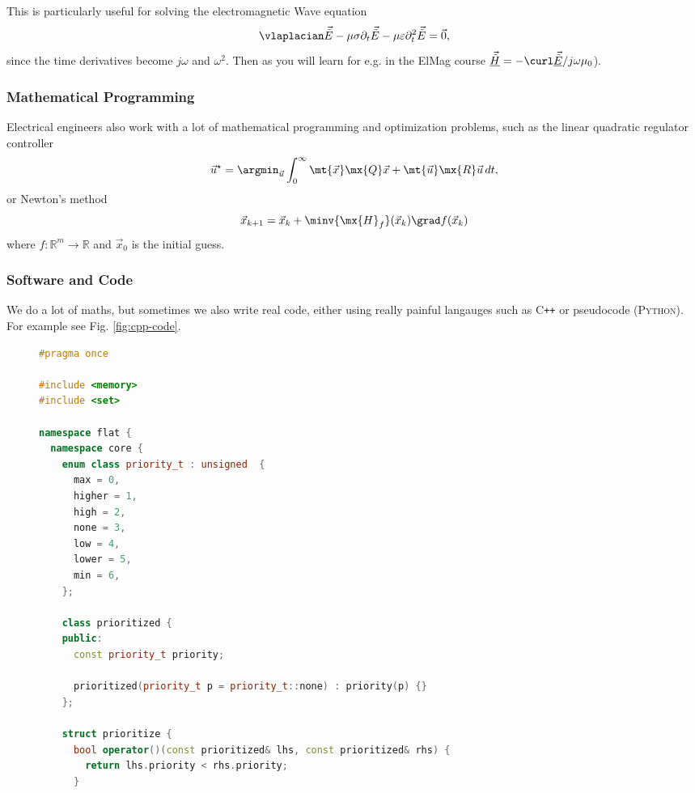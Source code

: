\documentclass[margin=normal]{hsrzf}
\begin{document}
\begin{english}
  This is particularly useful for solving the electromagnetic Wave equation
  \[
    \vlaplacian \vec{\tilde{E}} - \mu\sigma \partial_t \vec{\tilde{E}}
      - \mu\varepsilon \partial_t^2 \vec{\tilde{E}} = \vec{0},
  \]
  since the time derivatives become $j\omega$ and $\omega^2$. Then as you will
  learn for e.g. in the ElMag course $\underline{\vec{\tilde{H}}} = - \curl
  \underline{\vec{\tilde{E}}} / j\omega \mu_0$).

  \subsubsection{Mathematical Programming}

  Electrical engineers also work with a lot of mathematical programming and
  optimization problems, such as the linear quadratic regulator controller
  \[
    \vec{u}^\star = \argmin_{\vec{u}} \int_0^\infty
      \mt{\vec{x}} \mx{Q} \vec{x} + \mt{\vec{u}} \mx{R} \vec{u} \, dt,
  \]
  or Newton's method
  \[
    \vec{x}_{k+1} = \vec{x}_k + \minv{\mx{H}_f}(\vec{x}_k) \grad f(\vec{x}_k)
  \]
  where $f: \mathbb{R}^m \to \mathbb{R}$ and $\vec{x}_0$ is the initial guess.

  \subsubsection{Software and Code}

  We do a lot of maths, but sometimes we also write real code, either using
  really painful langauges such as C\texttt{++} or pseudocode
  (\textsc{Python}). For example see Fig. \ref{fig:cpp-code}.

  \begin{figure*}
    \begin{lstlisting}[language=c++]
#pragma once

#include <memory>
#include <set>

namespace flat {
  namespace core {
    enum class priority_t : unsigned  {
      max = 0,
      higher = 1,
      high = 2,
      none = 3,
      low = 4,
      lower = 5,
      min = 6,
    };

    class prioritized {
    public:
      const priority_t priority;

      prioritized(priority_t p = priority_t::none) : priority(p) {}
    };       

    struct prioritize {
      bool operator()(const prioritized& lhs, const prioritized& rhs) {
        return lhs.priority < rhs.priority;
      }


\end{lstlisting}
\end{figure*}
\end{english}
\end{document}
